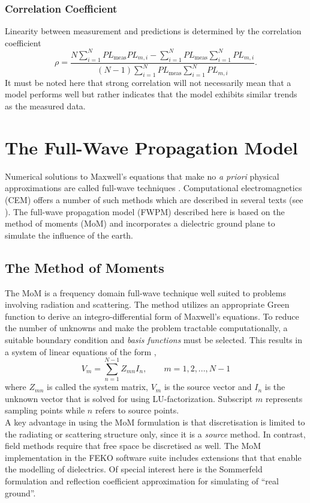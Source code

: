 \documentclass[10pt,journal,twoside]{IEEEtran}
\begin{document}
\subsubsection{Correlation Coefficient}
Linearity between measurement and predictions is determined by the correlation coefficient
\begin{equation}
	\rho = \dfrac{ \displaystyle N\sum_{i=1}^{N} PL_{\text{meas}} PL_{m,i} - \sum_{i=1}^{N} PL_{\text{meas}} \sum_{i=1}^{N} PL_{m,i} } { \displaystyle \left( N-1 \right) \sum_{i=1}^{N} PL_{\text{meas}} \sum_{i=1}^{N} PL_{m,i} }.
\end{equation}
It must be noted here that strong correlation will not necessarily mean that a model performs well but rather indicates that the model exhibits similar trends as the measured data.
%
\section{The Full-Wave Propagation Model}\label{The Full-Wave Propagation Model}
Numerical solutions to Maxwell's equations that make no \emph{a priori} physical approximations are called full-wave techniques \cite{Davidson2011}. Computational electromagnetics (CEM) offers a number of such methods which are described in several texts (see \cite{Davidson2011,Jin,Gibson}). The full-wave propagation model (FWPM) described here is based on the method of moments (MoM) and incorporates a dielectric ground plane to simulate the influence of the earth.%
%
\subsection{The Method of Moments}
The MoM is a frequency domain full-wave technique well suited to problems involving radiation and scattering. The method utilizes an appropriate Green function to derive an integro-differential form of Maxwell's equations. To reduce the number of unknowns and make the problem tractable computationally, a suitable boundary condition and \emph{basis functions} must be selected. %
This results in a system of linear equations of the form \cite{Jin},
\begin{equation}
 V_m  = \sum\limits_{n=1}^{N-1} Z_{mn} I_n, \qquad m = 1,2,...,N-1
\end{equation}
where $Z_{mn}$ is called the system matrix, $V_m$ is the source vector and $I_n$ is the unknown vector that is solved for using LU-factorization. Subscript $m$ represents sampling points while $n$ refers to source points.\\
A key advantage in using the MoM formulation is that discretisation is limited to the radiating or scattering structure only, since it is a \emph{source} method. In contrast, field methods require that free space be discretised as well. The MoM implementation in the FEKO software suite includes extensions that that enable the modelling of dielectrics. Of special interest here is the Sommerfeld formulation and reflection coefficient approximation for simulating of ``real ground''.
%
\end{document}
